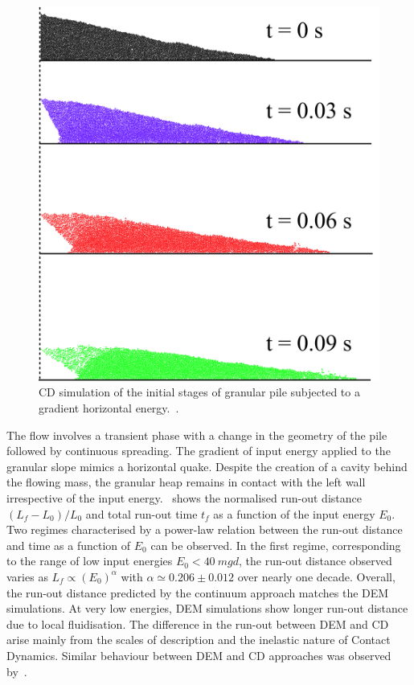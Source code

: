 \begin{figure}
\centering
\includegraphics[width=\textwidth]{Gradient_Slope_CD_200J}
\caption{CD simulation of the initial stages of granular pile subjected to a 
gradient horizontal energy.~\citep{Mutabaruka2013}.}
\label{fig:Gradient_Slope_CD_200J}
\end{figure}

The flow involves a transient phase with a change in the geometry of the pile 
followed by continuous spreading. The gradient of input energy applied to the 
granular slope mimics a horizontal quake. Despite the creation 
of a cavity behind the flowing mass, the granular heap remains in 
contact with the left wall irrespective of the input 
energy.~ shows the normalised run-out distance 
$(L_f - L_0)/L_0$ and total run-out time $t_f$ as a function of the input 
energy $E_0$. Two regimes characterised by a power-law relation between 
the run-out distance and time as a function of $E_0$ can be observed. In the 
first regime, corresponding to the range of low input energies $E_0 < 40 \ 
mgd$, the run-out distance observed varies as $L_f \propto (E_0)^\alpha$ with 
$\alpha 
\simeq 0.206 \pm 0.012$ over nearly one decade. Overall, the run-out distance 
predicted by the continuum approach matches the DEM simulations. At very low 
energies, DEM simulations show longer run-out distance due to local 
fluidisation. The difference in the run-out between DEM and CD arise mainly 
from the scales of description and the inelastic nature of Contact Dynamics. 
Similar behaviour between DEM and CD approaches was observed 
by~\citet{Radjai1997}. 


